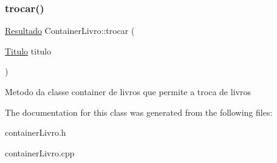 \subsubsection{\texorpdfstring{trocar()}{trocar()}}
{\footnotesize\ttfamily \hyperlink{classResultado}{Resultado} Container\+Livro\+::trocar (\begin{DoxyParamCaption}\item[{\hyperlink{classTitulo}{Titulo}}]{titulo }\end{DoxyParamCaption})}

Metodo da classe container de livros que permite a troca de livros 

The documentation for this class was generated from the following files\+:\begin{DoxyCompactItemize}
\item 
container\+Livro.\+h\item 
container\+Livro.\+cpp\end{DoxyCompactItemize}
